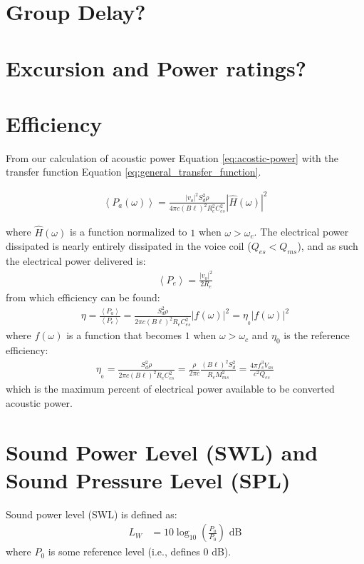 \documentclass[10pt]{book}
\begin{document}
\section{Group Delay?}

\section{Excursion and Power ratings?}

\section{Efficiency}
From our calculation of acoustic power Equation \ref{eq:acostic-power} with the transfer function Equation \ref{eq:general_transfer_function}.

\begin{align}
\left\langle P_a(\omega) \right\rangle =\frac{\left| v_o \right|^2S_d^2 \rho}{
4\pi c (B\ell)^2 
R_e^2C_{es}^2}\left| \hat{H}(\omega) \right|^2
\end{align}

where $\hat{H}(\omega)$ is a function normalized to $1$ when $\omega>\omega_c$. The electrical power dissipated  is nearly entirely dissipated in the voice coil ($Q_{es}<Q_{ms}$), and as such the electrical power delivered is:
\begin{align}
\left\langle P_e \right\rangle =\frac{\left| v_o \right|^2}{2 R_e}
\end{align}
from which efficiency can be found:
\begin{align}
\eta=\frac{\left\langle P_a \right\rangle}{\left\langle P_e \right\rangle}=\frac{S_d^2 \rho}{
2\pi c (B\ell)^2 
R_eC_{es}^2}\left| f(\omega) \right|^2=\eta_{_0}\left| f(\omega) \right|^2
\end{align}
where $f(\omega)$ is a function that becomes $1$ when $\omega>\omega_c$ and $\eta_0$ is the reference efficiency:
\begin{align}
\eta_{_0}=\frac{S_d^2 \rho}{
2\pi c (B\ell)^2 
R_eC_{es}^2}=\frac{\rho}{2\pi c}\frac{(B\ell)^2 S_d^2 }{R_eM_{ms}^2}=\frac{4\pi f_s^3 V_{as}}{c^2Q_{es}}
\end{align}
which is the maximum percent of electrical power available to be converted acoustic power.

\section{Sound Power Level (SWL) and Sound Pressure Level (SPL)}
Sound power level (SWL) is defined as:
\begin{align}
L_W&=10 \log_{10}\left( \frac{P_a}{P_0} \right) \mbox{ dB}
\end{align}
where $P_0$ is some reference level (i.e., defines $0$ dB).
\end{document}

